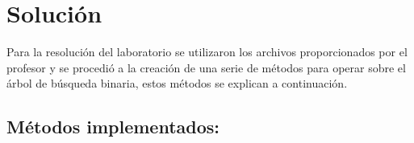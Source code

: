  


\section{Solución}
Para la resolución del laboratorio se utilizaron los archivos proporcionados por el profesor y se procedió a la creación de una serie de métodos para operar sobre el árbol de búsqueda binaria, estos métodos se explican a continuación.
\subsection{Métodos implementados:}

